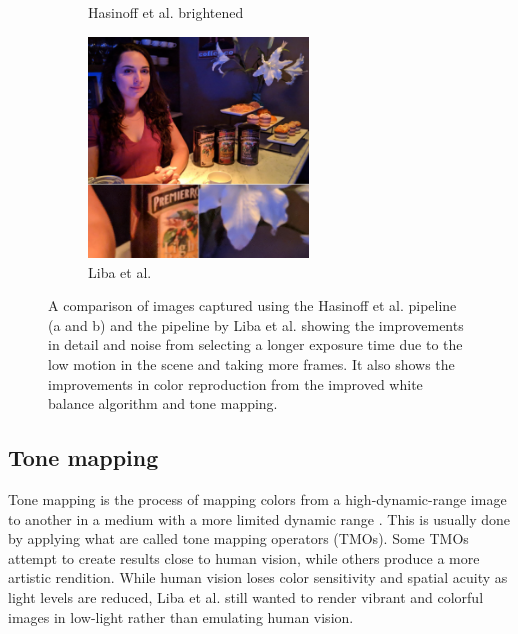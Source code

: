 \documentclass{sig-alternate}
\begin{document}
\begin{figure}
\begin{subfigure}{13.8pc}
\caption{Hasinoff et al. brightened}
\label{fig:libaResults:Hasinoff}
\end{subfigure}
\begin{subfigure}{13.8pc}
\centering
\includegraphics[width=13.8pc]{figures/liba2019-figure-1c-95quality.jpg}
\caption{Liba et al.}
\label{fig:libaResults:liba}
\end{subfigure}

\caption{A comparison of images captured using the Hasinoff et al. pipeline (a and b) and the pipeline by Liba et al. showing the improvements in detail and noise from selecting a longer exposure time due to the low motion in the scene and taking more frames. It also shows the improvements in color reproduction from the improved white balance algorithm and tone mapping.~\cite{Liba2019}}


\label{fig:libaResults}
\end{figure}




\subsection{Tone mapping}
\label{sec:toneMapping}


Tone mapping is the process of mapping colors from a high-dynamic-range image to another in a medium with a more limited dynamic range \cite{wiki:ToneMapping}. 
This is usually done by applying what are called tone mapping operators (TMOs). Some TMOs attempt to create results close to human vision, while others produce a more artistic rendition. While human vision loses color sensitivity and spatial acuity as light levels are reduced, Liba et al. still wanted to render vibrant and colorful images in low-light rather than emulating human vision.~\cite{Liba2019}
\end{document}
